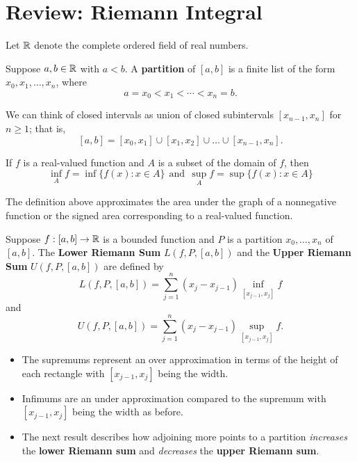 \documentclass[11pt,a4paper]{book}
\begin{document}
\section{Review: Riemann Integral}

Let \( \mathbb{R}  \) denote the complete ordered field of real numbers.


\begin{definition}[Partition]
    Suppose \( a,b \in \mathbb{R}  \) with \( a <  b  \). A \textbf{partition} of \( [a,b] \) is a finite list of the form \( {x}_{0}, {x}_{1}, \dots, {x}_{n} \), where 
    \[  a = {x}_{0} < {x}_{1} < \cdots < {x}_{n} = b. \]
\end{definition}

We can think of closed intervals as union of closed subintervals \( [{x}_{n-1}, {x}_{n}] \) for \( n \geq  1  \); that is,
\[  [a,b] = [{x}_{0}, {x}_{1}] \cup [{x}_{1}, {x}_{2}] \cup \dots \cup [{x}_{n-1}, {x}_{n}]. \]

\begin{definition}
    If \( f \) is a real-valued function and \( A  \) is a subset of the domain of \( f \), then  
    \[ \inf_{A} f = \inf \{ f(x) : x \in A  \} \ \ \text{and} \ \ \sup_{A} f = \sup \{ f(x) : x \in A  \}  \]
\end{definition}

The definition above approximates the area under the graph of a nonnegative function or the signed area corresponding to a real-valued function.

\begin{definition}
    Suppose \( f: [a,b] \to \mathbb{R}  \) is a bounded function and \( P  \) is a partition \( {x}_{0}, \dots, {x}_{n} \) of \( [a,b] \). The \textbf{Lower Riemann Sum} \( L(f, P, [a,b]) \) and the \textbf{Upper Riemann Sum} \( U(f, P, [a,b]) \) are defined by 
    \[  L(f, P , [a,b] ) = \sum_{ j=1  }^{ n } ({x}_{j} - {x}_{j-1}) \inf_{[{x}_{j-1}, {x}_{j}]} f  \]
    and 
    \[  U(f, P, [a,b]) = \sum_{ j=1  }^{ n  }({x}_{j} - {x}_{j-1}) \sup_{[{x}_{j-1}, {x}_{j}]} f. \]
\end{definition}

\begin{itemize}
    \item The supremums represent an over approximation in terms of the height of each rectangle with \( [{x}_{j-1}, {x}_{j}] \) being the width. 
    \item Infimums are an under approximation compared to the supremum with \( [{x}_{j-1}, {x}_{j}] \) being the width as before.
    \item The next result describes how adjoining more points to a partition \textit{increases} the \textbf{lower Riemann sum} and \textit{decreases}  the \textbf{upper Riemann sum}.
\end{itemize}
\end{document}
